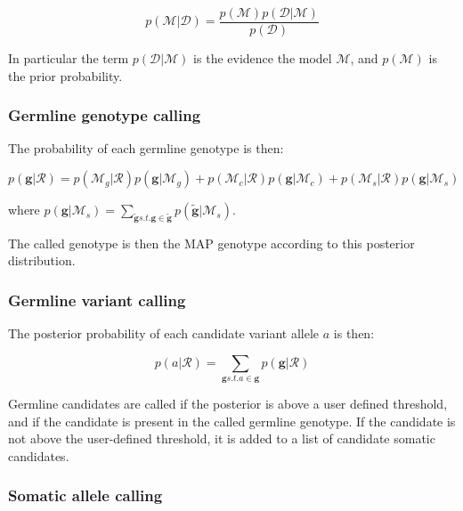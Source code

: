 \documentclass{article}
\begin{document}
\begin{equation}
\label{eq:bayes_model}
p(\mathcal{M} | \mathcal{D}) = \frac{p(\mathcal{M})p(\mathcal{D} | \mathcal{M})}{p(\mathcal{D})}
\end{equation}

In particular the term $p(\mathcal{D} | \mathcal{M})$  is the evidence the model $\mathcal{M}$, and $p(\mathcal{M})$ is the prior probability.

\subsubsection{Germline genotype calling}

The probability of each germline genotype is then:

\begin{equation}
\label{eq:som_germline_genotype}
p(\boldsymbol{g} | \mathcal{R}) = p(\mathcal{M}_g | \mathcal{R}) p(\boldsymbol{g} | \mathcal{M}_g) + p(\mathcal{M}_c | \mathcal{R}) p(\boldsymbol{g} | \mathcal{M}_c) + p(\mathcal{M}_s | \mathcal{R}) p(\boldsymbol{g} | \mathcal{M}_s)
\end{equation}

\noindent where $p(\boldsymbol{g} | \mathcal{M}_s) = \sum_{\tilde{\boldsymbol{g}} s.t. \boldsymbol{g} \in \tilde{\boldsymbol{g}}} p(\tilde{\boldsymbol{g}} | \mathcal{M}_s)$.

The called genotype is then the MAP genotype according to this posterior distribution.

\subsubsection{Germline variant calling}

The posterior probability of each candidate variant allele $a$ is then:

\begin{equation}
\label{eq:som_germline_candidate}
p(a | \mathcal{R}) = \sum_{\boldsymbol{g} s.t. a \in \boldsymbol{g}} p(\boldsymbol{g} | \mathcal{R})
\end{equation}

Germline candidates are called if the posterior is above a user defined threshold, and if the candidate is present in the called germline genotype. If the candidate is not above the user-defined threshold, it is added to a list of candidate somatic candidates.

\subsubsection{Somatic allele calling}
\end{document}
